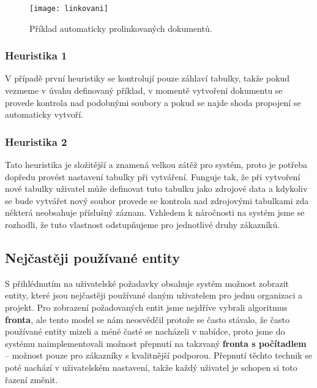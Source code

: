 \begin{figure}[htp]
\centering
\texttt{[image: linkovani]}
\caption{Příklad automaticky prolinkovaných dokumentů.}
\label{linkovani}
\end{figure}

\subsubsection{Heuristika 1}
\par V případě první heuristiky se kontrolují pouze záhlaví tabulky, takže pokud vezmeme v úvahu definovaný příklad, v momentě vytvoření dokumentu se provede kontrola nad podobnými soubory a pokud se najde shoda propojení se automaticky vytvoří.
\subsubsection{Heuristika 2}
\par Tato heuristika je složitější a znamená velkou zátěž pro systém, proto je potřeba dopředu provést nastavení tabulky při vytváření. Funguje tak, že při vytvoření nové tabulky uživatel může definovat tuto tabulku jako zdrojové data a kdykoliv se bude vytvářet nový soubor provede se kontrola nad zdrojovými tabulkami zda některá neobsahuje příslušný záznam. Vzhledem k náročnosti na systém jsme se rozhodli, že tuto vlastnost odstupňujeme pro jednotlivé druhy zákazníků.

\subsection{Nejčastěji používané entity}
\par S přihlédnutím na uživatelské požadavky obsahuje systém možnost zobrazit entity, které jsou nejčastěji používané daným uživatelem pro jednu organizaci a projekt. Pro zobrazení požadovaných entit jsme nejdříve vybrali algoritmus \textbf{fronta}, ale tento model se nám neosvědčil protože se často stávalo, že často používané entity mizeli a méně časté se nacházeli v nabídce, proto jsme do systému naimplementovali možnost přepnutí na takzvaný \textbf{fronta s počítadlem} -- možnost pouze pro zákazníky s kvalitnější podporou. Přepnutí těchto technik se poté nachází v uživatelském nastavení, takže každý uživatel je schopen si toto řazení změnit.

